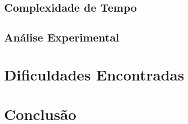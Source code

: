 \documentclass[a4paper,12pt,titlepage]{article}
\begin{document}
\subsection{Complexidade de Tempo}
\subsection{Análise Experimental}


\section{Dificuldades Encontradas}

\begin{figure}[H]
     \centering
     \caption{}
     \label{bsp}
\end{figure}

\section{Conclusão}



\newpage
\end{document}
